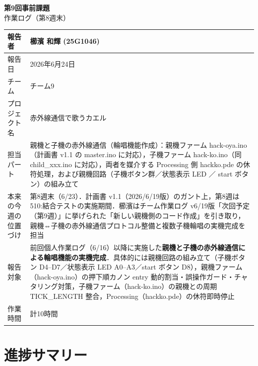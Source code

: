\documentclass[a4paper,11pt]{ltjsarticle}
\providecommand{\％}{\%}
\begin{document}
\begin{center}
    {\LARGE \textbf{第9回事前課題}}\\[0.4em]
    {\large 作業ログ（第8週末）}\\[1em]
\end{center}

\begin{tabular}{|p{4cm}|p{10cm}|}
\hline
報告者 & 櫛濱 和輝 (25G1046)\\
\hline
報告日 & 2026年6月24日\\
\hline
チーム & チーム9\\
\hline
プロジェクト名 & 赤外線通信で歌うカエル\\
\hline
担当パート & 親機と子機の赤外線通信（輪唱機能作成）：親機ファーム hack-oya.ino（計画書 v1.1 の master.ino に対応），子機ファーム hack-ko.ino（同 child\_xxx.ino に対応），両者を媒介する Processing 側 hackko.pde の休符処理，および親機回路（子機ボタン群／状態表示 LED ／ start ボタン）の組み立て\\
\hline
本来の今週の位置づけ & 第8週末（6/23）．計画書 v1.1（2026/6/19版）のガント上，第8週は 510:結合テストの実施期間．櫛濱はチーム作業ログ v6/19版「次回予定（第9週）」に挙げられた「新しい親機側のコード作成」を引き取り，親機⇔子機の赤外線通信プロトコル整備と複数子機輪唱の実機完成を担当\\
\hline
報告対象 & 前回個人作業ログ（6/16）以降に実施した\textbf{親機と子機の赤外線通信による輪唱機能の実機完成}．具体的には親機回路の組み立て（子機ボタン D4--D7／状態表示 LED A0--A3／start ボタン D8），親機ファーム（hack-oya.ino）の押下順カノン entry 動的割当・誤操作ガード・チャタリング対策，子機ファーム（hack-ko.ino）の親機との周期 TICK\_LENGTH 整合，Processing（hackko.pde）の休符即時停止\\
\hline
作業時間 & 計10時間\\
\hline
\end{tabular}

\vspace{1em}

\section{進捗サマリー}\label{sec:summary}
\end{document}
